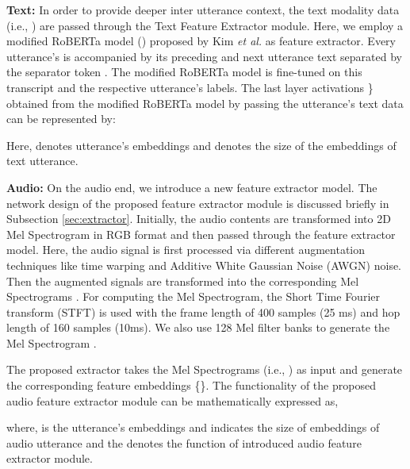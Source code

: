 \documentclass[10pt,twocolumn,letterpaper]{article}
\begin{document}
\textbf{Text:} In order to provide deeper inter utterance context, the text modality data (i.e., ) are passed through the Text Feature Extractor module. Here, we employ a modified RoBERTa model () proposed by Kim \textit{et al.} \cite{kim2021emoberta} as feature extractor. Every utterance's  is accompanied by its preceding and next utterance text separated by the separator token . The modified RoBERTa model is fine-tuned on this transcript and the respective utterance's labels. The last layer activations \} obtained from the modified RoBERTa model by passing the utterance's text data can be represented by:

Here,  denotes  utterance's embeddings and  denotes the size of the embeddings of text utterance.


\textbf{Audio:} On the audio end, we introduce a new feature extractor model. The network design of the proposed feature extractor module is discussed briefly in Subsection \ref{sec:extractor}. Initially, the audio contents are transformed into 2D Mel Spectrogram in RGB format and then passed through the feature extractor model. 
Here, the audio signal is first processed via different augmentation techniques like time warping and Additive White Gaussian Noise (AWGN) noise. Then the augmented signals are transformed into the corresponding Mel Spectrograms \cite{mel}. For computing the Mel Spectrogram, the Short Time Fourier transform (STFT) is used with the frame length of 400 samples (25 ms) and hop length of 160 samples (10ms). We also use 128 Mel filter banks to generate the Mel Spectrogram \cite{MelBank}. 

The proposed extractor takes the Mel Spectrograms (i.e., ) as input and generate the corresponding feature embeddings \{\}. The functionality of the proposed audio feature extractor module can be mathematically expressed as,

where,  is the  utterance's embeddings and  indicates the size of embeddings of audio utterance and the  denotes the function of introduced audio feature extractor module.
\end{document}
